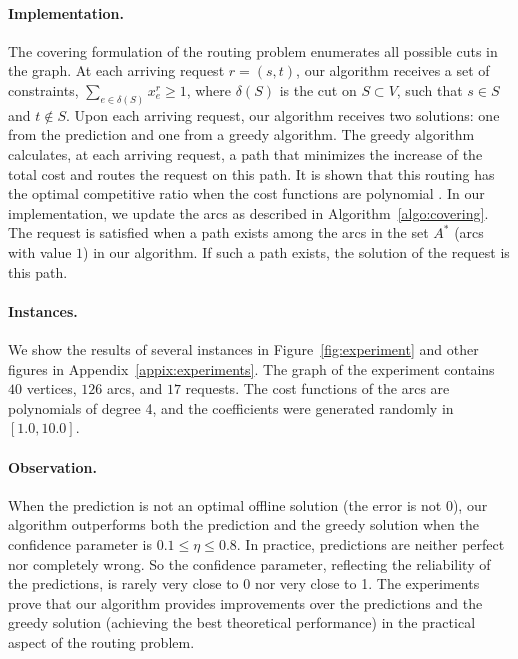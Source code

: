 \paragraph{Implementation.}
The covering formulation of the routing problem enumerates all possible cuts in the graph. At each arriving request $r = (s,t)$, our algorithm receives a set of constraints, $\sum_{e \in \delta(S)} x_{e}^{r} \ge 1$, where $\delta(S)$ is the cut on $S \subset V$, such that $s \in S$ and $t \notin S$.
Upon each arriving request, our algorithm receives two solutions: one from the prediction and one from a greedy algorithm. The greedy algorithm calculates, at each arriving request, a path that minimizes the increase of the total cost and routes the request on this path.
It is shown that this routing has the optimal competitive ratio when the cost functions are polynomial \cite[Section 4.2]{Thang20:Online-Primal-Dual}.
In our implementation, we update the arcs %
as described in Algorithm~\ref{algo:covering}.
The request is satisfied when a path exists among the arcs in the set $A^{*}$ (arcs with value $1$) in our algorithm. If such a path exists, the solution of the request is this path.

\paragraph{Instances.} We show the results of several instances in Figure~\ref{fig:experiment} and other figures  in Appendix~\ref{appix:experiments}. The graph of the experiment contains $40$ vertices, $126$ arcs, and $17$ requests. The cost functions of the arcs are polynomials of degree 4, and the coefficients were generated randomly in $[1.0, 10.0]$.

\paragraph{Observation.} When the prediction is not an optimal offline solution (the error is not 0),
our algorithm outperforms both the prediction and the greedy solution when the confidence parameter is $0.1 \leq \eta \leq 0.8$.
In practice, predictions are neither perfect nor completely wrong. So the confidence parameter, reflecting the reliability of the predictions,
is rarely very close to 0 nor very close to 1. The experiments prove that our algorithm provides improvements over the predictions and the greedy solution
(achieving the best theoretical performance) in the practical aspect of the routing problem.

